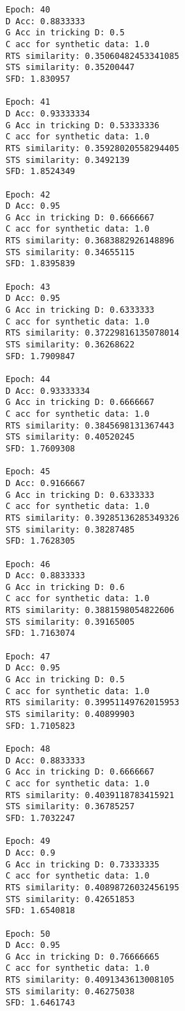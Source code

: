 \documentclass[11pt]{article}
\begin{document}
\begin{Verbatim}[commandchars=\\\{\}]
Epoch: 40
D Acc: 0.8833333
G Acc in tricking D: 0.5
C acc for synthetic data: 1.0
RTS similarity: 0.35060482453341085
STS similarity: 0.35200447
SFD: 1.830957

Epoch: 41
D Acc: 0.93333334
G Acc in tricking D: 0.53333336
C acc for synthetic data: 1.0
RTS similarity: 0.35928020558294405
STS similarity: 0.3492139
SFD: 1.8524349

Epoch: 42
D Acc: 0.95
G Acc in tricking D: 0.6666667
C acc for synthetic data: 1.0
RTS similarity: 0.3683882926148896
STS similarity: 0.34655115
SFD: 1.8395839

Epoch: 43
D Acc: 0.95
G Acc in tricking D: 0.6333333
C acc for synthetic data: 1.0
RTS similarity: 0.37229816135078014
STS similarity: 0.36268622
SFD: 1.7909847

Epoch: 44
D Acc: 0.93333334
G Acc in tricking D: 0.6666667
C acc for synthetic data: 1.0
RTS similarity: 0.3845698131367443
STS similarity: 0.40520245
SFD: 1.7609308

Epoch: 45
D Acc: 0.9166667
G Acc in tricking D: 0.6333333
C acc for synthetic data: 1.0
RTS similarity: 0.39285136285349326
STS similarity: 0.38287485
SFD: 1.7628305

Epoch: 46
D Acc: 0.8833333
G Acc in tricking D: 0.6
C acc for synthetic data: 1.0
RTS similarity: 0.3881598054822606
STS similarity: 0.39165005
SFD: 1.7163074

Epoch: 47
D Acc: 0.95
G Acc in tricking D: 0.5
C acc for synthetic data: 1.0
RTS similarity: 0.39951149762015953
STS similarity: 0.40899903
SFD: 1.7105823

Epoch: 48
D Acc: 0.8833333
G Acc in tricking D: 0.6666667
C acc for synthetic data: 1.0
RTS similarity: 0.4039118783415921
STS similarity: 0.36785257
SFD: 1.7032247

Epoch: 49
D Acc: 0.9
G Acc in tricking D: 0.73333335
C acc for synthetic data: 1.0
RTS similarity: 0.40898726032456195
STS similarity: 0.42651853
SFD: 1.6540818

Epoch: 50
D Acc: 0.95
G Acc in tricking D: 0.76666665
C acc for synthetic data: 1.0
RTS similarity: 0.4091343613008105
STS similarity: 0.46275038
SFD: 1.6461743


    \end{Verbatim}


    
    
    
    
\end{document}
